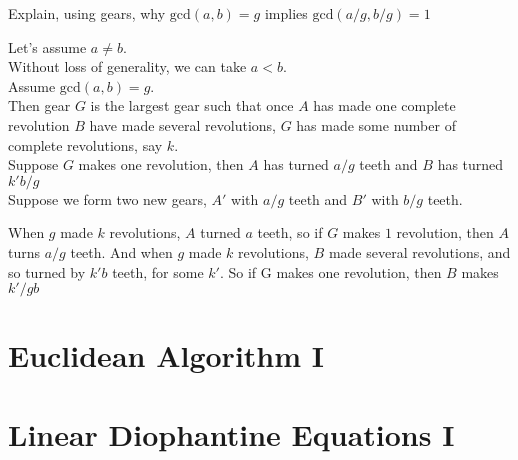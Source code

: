 \begin{example}
Explain, using gears, why $\text{gcd}(a,b) = g$ implies $\text{gcd}(a/g,b/g) = 1$

Let's assume $a \neq b$.\\ 
Without loss of generality, we can take $a < b$.\\
Assume $\text{gcd}(a,b) = g$. \\
Then gear $G$ is the largest gear such that once $A$ has made one complete revolution $B$ have made several revolutions, 
$G$ has made some number of complete revolutions, say $k$. \\

Suppose $G$ makes one revolution, then $A$ has turned $a/g$ teeth and $B$ has turned $k'b/g$ \\
Suppose we form two new gears, $A'$ with $a/g$ teeth and $B'$ with $b/g$ teeth.

When $g$ made $k$ revolutions, $A$ turned $a$ teeth, so if $G$ makes $1$ revolution, 
then $A$ turns $a/g$ teeth. And when $g$ made $k$ revolutions, $B$ made several revolutions, and so turned 
by $k'b$ teeth, for some $k'$. So if G makes one revolution, then $B$ makes $k'/g b$



\end{example}





\section{Euclidean Algorithm I}

\section{Linear Diophantine Equations I}